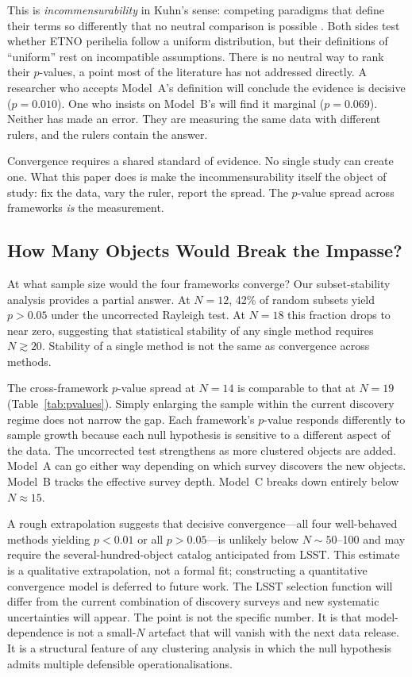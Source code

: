 \documentclass[usenatbib]{mnras}
\begin{document}
This is \textit{incommensurability} in Kuhn's sense: competing paradigms that define their terms so differently that no neutral comparison is possible \cite{kuhn1962}. Both sides test whether ETNO perihelia follow a uniform distribution, but their definitions of ``uniform'' rest on incompatible assumptions. There is no neutral way to rank their $p$-values, a point most of the literature has not addressed directly. A researcher who accepts Model~A's definition will conclude the evidence is decisive ($p=0.010$). One who insists on Model~B's will find it marginal ($p=0.069$). Neither has made an error. They are measuring the same data with different rulers, and the rulers contain the answer.

Convergence requires a shared standard of evidence. No single study can create one. What this paper does is make the incommensurability itself the object of study: fix the data, vary the ruler, report the spread. The $p$-value spread across frameworks \textit{is} the measurement.

\subsection{How Many Objects Would Break the Impasse?}

At what sample size would the four frameworks converge? Our subset-stability analysis provides a partial answer. At $N=12$, 42\% of random subsets yield $p>0.05$ under the uncorrected Rayleigh test. At $N=18$ this fraction drops to near zero, suggesting that statistical stability of any single method requires $N\gtrsim20$. Stability of a single method is not the same as convergence across methods.

The cross-framework $p$-value spread at $N=14$ is comparable to that at $N=19$ (Table~\ref{tab:pvalues}). Simply enlarging the sample within the current discovery regime does not narrow the gap. Each framework's $p$-value responds differently to sample growth because each null hypothesis is sensitive to a different aspect of the data. The uncorrected test strengthens as more clustered objects are added. Model~A can go either way depending on which survey discovers the new objects. Model~B tracks the effective survey depth. Model~C breaks down entirely below $N\approx15$.


A rough extrapolation suggests that decisive convergence---all four well-behaved methods yielding $p<0.01$ or all $p>0.05$---is unlikely below $N\sim50$--100 and may require the several-hundred-object catalog anticipated from LSST. This estimate is a qualitative extrapolation, not a formal fit; constructing a quantitative convergence model is deferred to future work. The LSST selection function will differ from the current combination of discovery surveys and new systematic uncertainties will appear. The point is not the specific number. It is that model-dependence is not a small-$N$ artefact that will vanish with the next data release. It is a structural feature of any clustering analysis in which the null hypothesis admits multiple defensible operationalisations.
\end{document}
